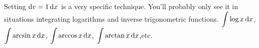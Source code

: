 
\begin{frame}
Setting $ \text{d} v=1\,\text{d} x$ is a very specific technique. You'll probably only see it in situations integrating logarithms and inverse trigonometric functions.
\vfill
$\displaystyle\int \log x\, \text{d} x$,\hfill $\displaystyle\int \arcsin x\, \text{d} x$, \hfill $\displaystyle\int \arccos x\, \text{d} x$, \hfill $\displaystyle\int \arctan x \,\text{d} x$,\hfill etc.
\end{frame}

